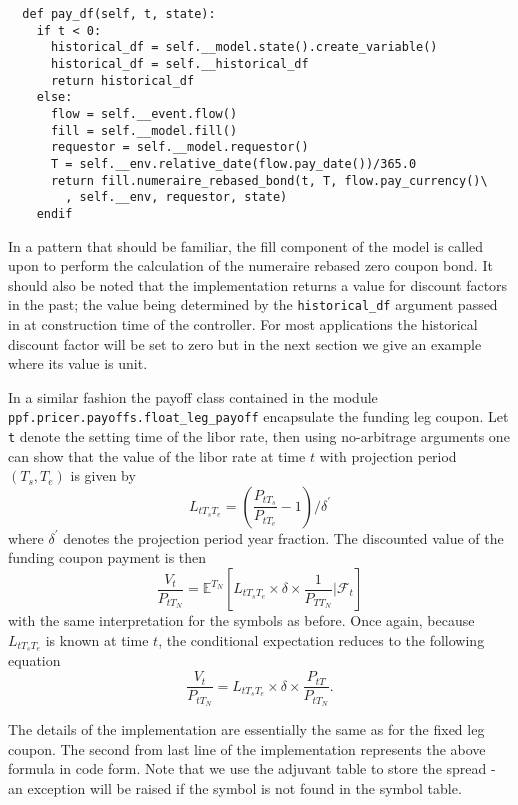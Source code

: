 \begin{verbatim}
  def pay_df(self, t, state):
    if t < 0:
      historical_df = self.__model.state().create_variable()
      historical_df = self.__historical_df
      return historical_df
    else:
      flow = self.__event.flow()
      fill = self.__model.fill()
      requestor = self.__model.requestor()
      T = self.__env.relative_date(flow.pay_date())/365.0
      return fill.numeraire_rebased_bond(t, T, flow.pay_currency()\
        , self.__env, requestor, state)
    endif
\end{verbatim}
In a pattern that should be familiar, the fill component of the model is called upon to perform the calculation of the numeraire rebased zero coupon bond. 
It should also be noted that the implementation returns a value for discount factors in the past; the value being determined by the \verb|historical_df| argument 
passed in at construction time of the controller. For most applications the historical discount factor will be set to zero but in the next section we give an example 
where its value is unit.  


In a similar fashion the payoff class contained in the module \\
\verb|ppf.pricer.payoffs.float_leg_payoff| encapsulate the funding leg coupon. 
Let \verb|t| denote the setting time of the libor rate, then using no-arbitrage arguments one can show that the value of the libor 
rate at time $t$ with projection period $(T_s, T_e)$ is given by 
\begin{equation}
L_{t T_s T_e} = \left(\frac{P_{tT_s}}{P_{tT_e}}-1\right)/\delta^{'}
\end{equation}
where $\delta^{'}$ denotes the projection period year fraction. The discounted value of the funding coupon payment is then 
\begin{equation}
\frac{V_t}{P_{tT_{N}}} = \mathbb E^{T_N} [ L_{t T_s T_e} \times \delta \times  \frac{1}{P_{TT_N}} | \mathcal F_t]
\end{equation} 
with the same interpretation for the symbols as before. Once again, because $L_{t T_s T_e}$ is known at time $t$, the 
conditional expectation reduces to the following equation
\begin{equation}
\frac{V_t}{P_{tT_{N}}} = L_{t T_s T_e} \times \delta \times  \frac{P_{tT}}{P_{tT_N}}.
\end{equation} 

The details of the implementation are essentially the same as for the fixed leg coupon. The second from last line of the implementation represents 
the above formula in code form. Note that we use the adjuvant table to store the spread - an exception will be raised if the symbol is not 
found in the symbol table. 

